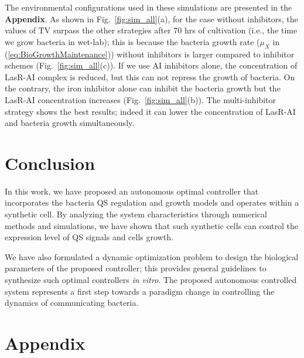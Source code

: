 \documentclass[runningheads]{llncs}
\begin{document}
The environmental configurations used in these simulations are presented in the \textbf{Appendix}. As shown in Fig.~\ref{fig:sim_all}(a), for the case without inhibitors, the values of TV surpass the other strategies after 70 hrs of cultivation (i.e., the time we grow bacteria in wet-lab); this is because the bacteria growth rate ($\mu_X$ in (\ref{eq:BioGrowthMaintenance})) without inhibitors is larger compared to inhibitor schemes (Fig.~\ref{fig:sim_all}(c)).  
If we use AI inhibitors alone, the concentration of LasR-AI complex is reduced, but this can not repress the growth of bacteria. On the contrary, the iron inhibitor alone can inhibit the bacteria growth but the LasR-AI concentration increases (Fig.~\ref{fig:sim_all}(b)). The multi-inhibitor strategy shows the best results; indeed it can lower the concentration of LasR-AI and bacteria growth simultaneously.     

\vspace{-5pt}

\section{Conclusion}\label{conclusion}
In this work, we have proposed an autonomous optimal controller that incorporates the bacteria QS regulation and growth models and operates within a synthetic cell. By analyzing the system characteristics through numerical methods and simulations, we have shown that such synthetic cells can control the expression level of QS signals and cells growth. 

We have also formulated a dynamic optimization problem to design the biological parameters of the proposed controller; this provides general guidelines to synthesize such optimal controllers \textit{in vitro}. The proposed autonomous controlled system represents a first step towards a paradigm change in controlling the dynamics of communicating bacteria. 




\newpage
\section*{Appendix}
\end{document}
